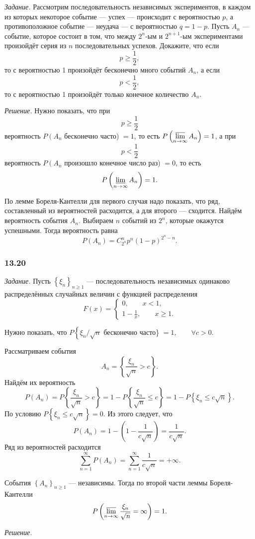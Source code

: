 \textit{Задание.}
Рассмотрим последовательность независимых экспериментов,
в каждом из которых некоторое событие --- успех --- происходит с вероятностью $p$, а противоположное событие --- неудача --- с вероятностью $q = 1 - p$.
Пусть $A_n$ --- событие, которое состоит в том, что между $2^n$-ым и $2^{n+1}$-ым экспериментами произойдёт серия из $n$ последовательных успехов.
Докажите, что если
$$p \geq \frac{1}{2},$$
то с вероятностью 1 произойдёт бесконечно много событий $A_n$, а если
$$p < \frac{1}{2},$$
то с вероятностью 1 произойдёт только конечное количество $A_n$.

\textit{Решение.} Нужно показать, что при
$$p \geq \frac{1}{2}$$
вероятность $P \left( A_n \right.$ бесконечно часто) $= 1$, то есть $P \left( \varlimsup \limits_{n \to \infty } A_n \right) = 1$, а при
$$p < \frac{1}{2}$$
вероятность $P \left( A_n \right.$ произошло конечное число раз) $= 0$, то есть
$$P \left( \varliminf \limits_{n \to \infty } A_n \right) = 1.$$

По лемме Бореля-Кантелли для первого случая надо показать, что ряд, составленный из вероятностей расходится, а для второго --- сходится.
Найдём вероятность события $A_n$.
Выбираем $n$ событий из $2^n$, которые окажутся успешными.
Тогда вероятность равна
$$P \left( A_n \right) =
C_{2^n}^n p^n \left( 1 - p \right)^{2^n-n}.$$

\subsubsection*{13.20}

\textit{Задание.} Пусть $ \left\{ \xi_n \right\}_{n \geq 1}$ --- последовательность независимых одинаково распределённых случайных величин с функцией распределения
$$F \left( x \right) =
\begin{cases}
0, \qquad x < 1, \\
1 - \frac{1}{x}, \qquad x \geq 1.
\end{cases}$$

Нужно показать, что $P \left\{ \xi_n/ \sqrt{n} \right.$ бесконечно часто\} $= 1, \qquad \forall c > 0$.

Рассматриваем события
$$A_n =
\left\{ \frac{ \xi_n}{ \sqrt{n}} > c \right\}.$$
Найдём их вероятность
$$P \left( A_n \right) =
P \left\{ \frac{ \xi_n}{ \sqrt{n}} > c \right\} =
1 - P \left\{ \frac{ \xi_n}{ \sqrt{n}} \leq c \right\} =
1 - P \left\{ \xi_n \leq c \sqrt{n} \right\}.$$
По условию $P \left\{ \xi_n \leq c \sqrt{n} \right\} = 0$.
Из этого следует, что
$$P \left( A_n \right) =
1 - \left( 1 - \frac{1}{c \sqrt{n}} \right) =
\frac{1}{c \sqrt{n}}.$$
Ряд из вероятностей расходится
$$ \sum \limits_{n=1}^{ \infty }P \left( A_n \right) =
\sum \limits_{n=1}^{ \infty } \frac{1}{c \sqrt{n}} =
+ \infty.$$

События $ \left\{ A_n \right\}_{n \geq 1}$ --- независимы.
Тогда по второй части леммы Бореля-Кантелли
$$P \left( \varlimsup \limits_{n \to \infty } \frac{ \xi_n}{ \sqrt{n}} = \infty \right) =
1.$$ 
 
\textit{Решение.}

